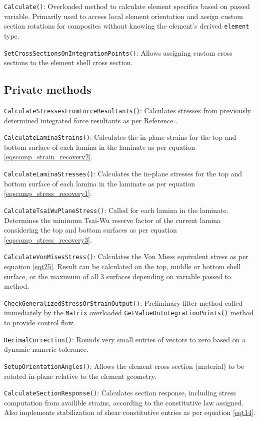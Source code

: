 \texttt{Calculate()}: Overloaded method to calculate element specifics based on passed variable. Primarily used to access local element orientation and assign custom section rotations for composites without knowing the element's derived \texttt{element} type.

\texttt{SetCrossSectionsOnIntegrationPoints()}: Allows assigning custom cross sections to the element shell cross section.

\subsection{Private methods}
\texttt{CalculateStressesFromForceResultants()}: Calculates stresses from previously determined integrated force resultants as per Reference \cite{FelippaKirchhoff2017}.

\texttt{CalculateLaminaStrains()}: Calculates the in-plane strains for the top and bottom surface of each lamina in the laminate as per equation \ref{eqscomp_strain_recovery2}.

\texttt{CalculateLaminaStresses()}: Calculates the in-plane stresses for the top and bottom surface of each lamina in the laminate as per equation \ref{eqscomp_stress_recovery1}.

\texttt{CalculateTsaiWuPlaneStress()}: Called for each lamina in the laminate. Determines the minimum Tsai-Wu reserve factor of the current lamina considering the top and bottom surfaces as per equation \ref{eqscomp_stress_recovery3}.

\texttt{CalculateVonMisesStress()}: Calculates the Von Mises equivalent stress as per equation \ref{eqt25}. Result can be calculated on the top, middle or bottom shell surface, or the maximum of all 3 surfaces depending on variable passed to method.

\texttt{CheckGeneralizedStressOrStrainOutput()}: Preliminary filter method called immediately by the \texttt{Matrix} overloaded \texttt{GetValueOnIntegrationPoints()} method to provide control flow.

\texttt{DecimalCorrection()}: Rounds very small entries of vectors to zero based on a dynamic numeric tolerance.

\texttt{SetupOrientationAngles()}: Allows the element cross section (material) to be rotated in-plane relative to the element geometry.

\texttt{CalculateSectionResponse()}: Calculates section response, including stress computation from availible strains, according to the constitutive law assigned. Also implements stabilization of shear constitutive entries as per equation \ref{eqt14}.

